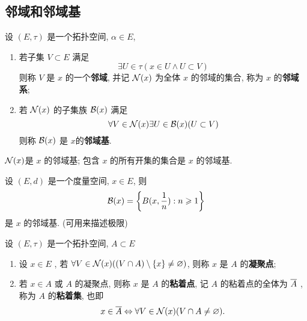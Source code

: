      \subsection{邻域和邻域基}

     \begin{Definition}[邻域基]\label{def:邻域基}
          设 $ (E, \tau) $ 是一个拓扑空间, $ \alpha\in E $, 
          \begin{enumerate}[(1)]
               \item 若子集 $ V\subset E $ 满足
               \[
                    \exists U\in \tau(x\in U\wedge U\subset V)
               \]
               则称 $ V $ 是 $ x $ 的一个\textbf{邻域}, 并记 $ \CN{x} $ 为全体 $ x $ 的邻域的集合, 称为 $ x $ 的\textbf{邻域系};
               \item 若 $ \CN{x} $ 的子集族 $ \CB{x} $ 满足
               \[
                    \forall V\in \CN{x}\exists U\in \CB{x}(U\subset V)
               \]  
               则称 $ \CB{x} $ 是 $ x $的\textbf{邻域基}. 
          \end{enumerate}
     \end{Definition}
     \begin{Remark}
          $ \CN{x} $是 $ x $  的邻域基; 包含 $ x $ 的所有开集的集合是 $ x $ 的邻域基. 
     \end{Remark}
     \begin{Example}
          设 $ (E, d) $ 是一个度量空间, $ x\in E $, 则 
          \[
               \CB{x}=\left\{ B(x,\frac{1}{n}): n\geqslant 1 \right\} 
          \]
          是 $ x $ 的邻域基. (可用来描述极限)
     \end{Example}
     \begin{Definition}[粘着集]
          设 $ (E, \tau) $ 是一个拓扑空间, $ A\subset E $ 
          \begin{enumerate}[(1)]
               \item 设 $ x\in E $ , 若 $ \forall V\in \CN{x}((V\cap A)\sm \{ x \}\neq\varnothing) $, 则称 $ x $ 是 $ A $ 的\textbf{凝聚点};
               \item 若 $ x\in A $ 或 $ A $  的凝聚点, 则称 $ x $ 是 $ A $ 的\textbf{粘着点}, 记 $ A $ 的粘着点的全体为 $ \baro{A} $ , 称为 $ A $ 的\textbf{粘着集}, 也即
               \[
                    x\in \baro{A}\Leftrightarrow \forall V\in \CN{x}(V\cap A\neq\varnothing).    
               \]
          \end{enumerate}
     \end{Definition}
